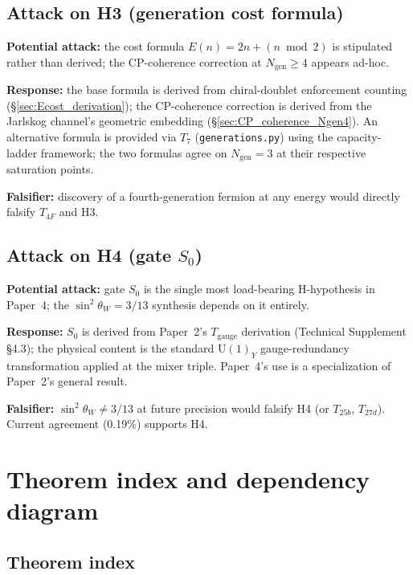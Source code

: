 \documentclass[11pt]{article}
\newcommand{\Un}{\mathrm{U}}
\theoremstyle{definition}
\begin{document}
\subsection{Attack on H3 (generation cost formula)}\label{sec:redteam_H3}

\textbf{Potential attack:} the cost formula $E(n) = 2n + (n \bmod 2)$ is stipulated rather than derived; the CP-coherence correction at $N_{\mathrm{gen}} \geq 4$ appears ad-hoc.

\textbf{Response:} the base formula is derived from chiral-doublet enforcement counting (\S\ref{sec:Ecost_derivation}); the CP-coherence correction is derived from the Jarlskog channel's geometric embedding (\S\ref{sec:CP_coherence_Ngen4}). An alternative formula is provided via $T_7$ (\texttt{generations.py}) using the capacity-ladder framework; the two formulas agree on $N_{\mathrm{gen}} = 3$ at their respective saturation points.

\textbf{Falsifier:} discovery of a fourth-generation fermion at any energy would directly falsify $T_{4F}$ and H3.

\subsection{Attack on H4 (gate \texorpdfstring{$S_0$}{S0})}\label{sec:redteam_H4}

\textbf{Potential attack:} gate $S_0$ is the single most load-bearing H-hypothesis in Paper~4; the $\sin^2\theta_W = 3/13$ synthesis depends on it entirely.

\textbf{Response:} $S_0$ is derived from Paper~2's $T_{\mathrm{gauge}}$ derivation (Technical Supplement \S4.3); the physical content is the standard $\Un(1)_Y$ gauge-redundancy transformation applied at the mixer triple. Paper~4's use is a specialization of Paper~2's general result.

\textbf{Falsifier:} $\sin^2\theta_W \neq 3/13$ at future precision would falsify H4 (or $T_{25b}$, $T_{27d}$). Current agreement (0.19\%) supports H4.

\clearpage

\section{Theorem index and dependency diagram}\label{sec:index}

\subsection{Theorem index}\label{sec:theorem_index}
\end{document}
